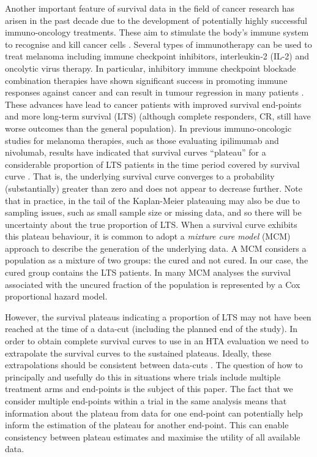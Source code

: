 \documentclass[AMA,STIX1COL]{WileyNJD-v2}
\begin{document}
Another important feature of survival data in the field of cancer research has arisen in the past decade due to the development of potentially highly successful immuno-oncology treatments.
These aim to stimulate the body’s immune system to recognise and kill cancer cells \cite{Ouwens2019}. Several types of immunotherapy can be used to treat melanoma including immune checkpoint inhibitors, interleukin-2 (IL-2) and oncolytic virus therapy.
In particular, inhibitory immune checkpoint blockade combination therapies have shown significant success in promoting immune responses against cancer and can result in tumour regression in many patients \cite{Khair2019}.
These advances have lead to cancer patients with improved survival end-points and more long-term survival (LTS) (although complete responders, CR, still have worse outcomes than the general population).
In previous immuno-oncologic studies for melanoma therapies, such as those evaluating ipilimumab and nivolumab, results have indicated that survival curves ``plateau'' for a considerable proportion of LTS patients in the time period covered by survival curve \citep{Wolchok2017, Larkin2019}.
That is, the underlying survival curve converges to a probability (substantially) greater than zero and does not appear to decrease further.
Note that in practice, in the tail of the Kaplan-Meier plateauing may also be due to sampling issues, such as small sample size or missing data, and so there will be uncertainty about the true proportion of LTS.
When a survival curve exhibits this plateau behaviour, it is common to adopt a \textit{mixture cure model} (MCM) approach to describe the generation of the underlying data.
A MCM considers a population as a mixture of two groups: the cured and not cured.
In our case, the cured group contains the LTS patients.
In many MCM analyses the survival associated with the uncured fraction of the population is represented by a Cox proportional hazard model.

However, the survival plateaus indicating a proportion of LTS may not have been reached at the time of a data-cut (including the planned end of the study).
In order to obtain complete survival curves to use in an HTA evaluation we need to extrapolate the survival curves to the sustained plateaus.
Ideally, these extrapolations should be consistent between data-cuts \citep{Bullement2020}.
The question of how to principally and usefully do this in situations where trials include multiple treatment arms and end-points is the subject of this paper.
The fact that we consider multiple end-points within a trial in the same analysis means that information about the plateau from data for one end-point can potentially help inform the estimation of the plateau for another end-point.
This can enable consistency between plateau estimates and maximise the utility of all available data.
\end{document}
